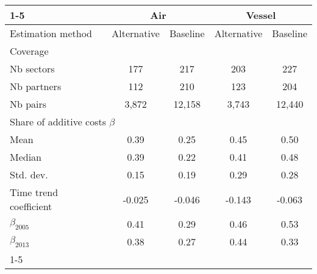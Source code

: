 \begin{tabular}{l|cc|cc}
\cline{1-5}
\multicolumn{1}{c}{Transport mode} &
  \multicolumn{2}{|c|}{Air} &
  \multicolumn{2}{c}{Vessel} \\ \hline
Estimation method &
Alternative &
Baseline &
Alternative &
Baseline \\ \hline
Coverage  \\ \hline
\hspace{1em}Nb sectors &
177 &
217 &
203 &
227 \\
\hspace{1em}Nb partners &
112 &
210 &
123 &
204 \\
\hspace{1em}Nb pairs &
3,872 &
12,158 &
3,743 &
12,440 \\ \hline
\multicolumn{5}{l}{Share of additive costs $\beta$}  \\ \hline
\hspace{1em}Mean &
0.39 &
0.25 &
0.45 &
0.50 \\
\hspace{1em}Median &
0.39 &
0.22 &
0.41 &
0.48 \\
\hspace{1em}Std. dev. &
0.15 &
0.19 &
0.29 &
0.28 \\
\hspace{1em}Time trend coefficient &
-0.025 &
-0.046 &
-0.143 &
-0.063 \\ \hline
$\beta_{2005}$ &
  0.41 &
0.29 &
0.46 &
0.53 \\
$\beta_{2013}$ &
0.38 &
0.27 &
0.44 &
0.33 \\
\cline{1-5}
\end{tabular}
